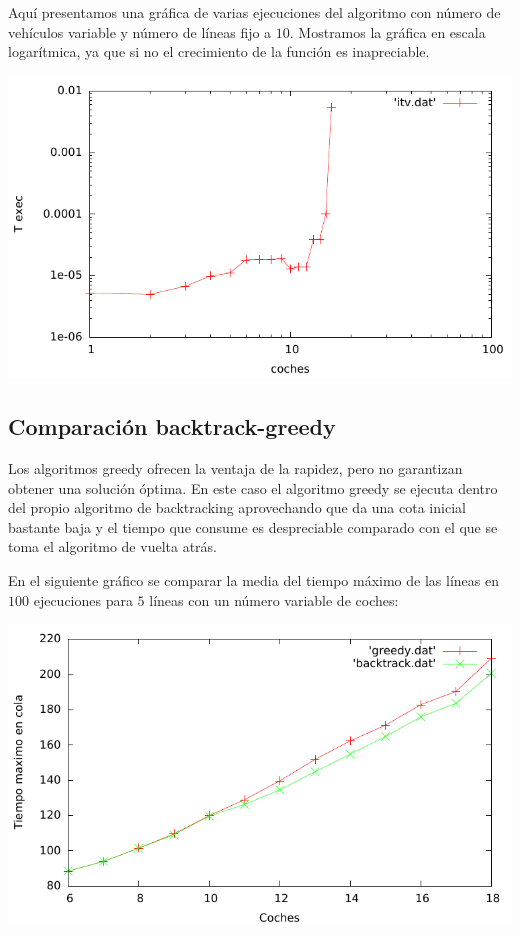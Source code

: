 \documentclass[a4paper, 11pt]{article}
\begin{document}
Aquí presentamos una gráfica de varias ejecuciones del algoritmo con número de vehículos variable y número de líneas fijo a $10$. Mostramos la gráfica en escala logarítmica, ya que si no el crecimiento de la función es inapreciable.

\begin{center}
	\includegraphics{./img/itvEficiencia}
\end{center}

\newpage
\subsection{Comparación backtrack-greedy}

Los algoritmos greedy ofrecen la ventaja de la rapidez, pero no garantizan obtener una solución óptima. En este caso el algoritmo greedy se ejecuta dentro del propio algoritmo de backtracking aprovechando que da una cota inicial bastante baja y el tiempo que consume es despreciable comparado con el que se toma el algoritmo de vuelta atrás.

En el siguiente gráfico se comparar la media del tiempo máximo de las líneas en $100$ ejecuciones para $5$ líneas con un número variable de coches:

\begin{center}
	\includegraphics{./img/comp}
\end{center}
\end{document}
